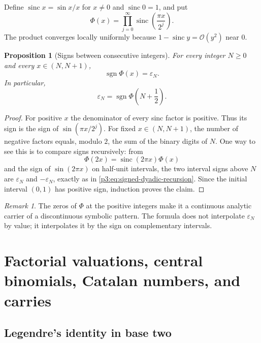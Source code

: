 \documentclass[11pt,oneside]{article}
\newtheorem{proposition}[theorem]{Proposition}
\theoremstyle{definition}
\theoremstyle{remark}
\newtheorem{remark}[theorem]{Remark}
\newcommand{\bigO}{\mathcal O}
\newcommand{\sgn}{\operatorname{sgn}}
\newcommand{\sinc}{\operatorname{sinc}}
\newcommand{\eps}{\varepsilon}
\begin{document}
Define $\sinc x=\sin x/x$ for $x\ne0$ and $\sinc 0=1$, and put
\begin{equation}\label{p3:eq:sinc-product}
 \Phi(x)=\prod_{j=0}^{\infty}\sinc\!\left(\frac{\pi x}{2^j}\right).
\end{equation}
The product converges locally uniformly because
$1-\sinc y=\bigO(y^2)$ near $0$.

\begin{proposition}[Signs between consecutive integers]\label{p3:prop:sinc-sign}
For every integer $N\ge0$ and every $x\in(N,N+1)$,
\begin{equation}\label{p3:eq:sinc-sign-interval}
 \sgn\Phi(x)=\eps_N.
\end{equation}
In particular,
\begin{equation}\label{p3:eq:sinc-half-integer}
 \eps_N=\sgn\Phi\!\left(N+\frac12\right).
\end{equation}
\end{proposition}

\begin{proof}
For positive $x$ the denominator of every sinc factor is positive.  Thus its
sign is the sign of $\sin(\pi x/2^j)$.  For fixed $x\in(N,N+1)$, the number of
negative factors equals, modulo $2$, the sum of the binary digits of $N$.
One way to see this is to compare signs recursively: from
\[
 \Phi(2x)=\sinc(2\pi x)\Phi(x)
\]
and the sign of $\sin(2\pi x)$ on half-unit intervals, the two interval signs
above $N$ are $\eps_N$ and $-\eps_N$, exactly as in
\cref{p3:eq:signed-dyadic-recursion}.  Since the initial interval $(0,1)$ has
positive sign, induction proves the claim.
\end{proof}

\begin{remark}
The zeros of $\Phi$ at the positive integers make it a continuous analytic
carrier of a discontinuous symbolic pattern.  The formula does not interpolate
$\eps_N$ by value; it interpolates it by the sign on complementary intervals.
\end{remark}

\section{Factorial valuations, central binomials, Catalan numbers, and carries}

\subsection{Legendre's identity in base two}
\end{document}
